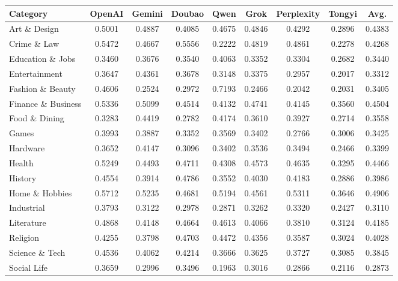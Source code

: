 \documentclass[11pt]{article}
\begin{document}
\begin{table}[H]
  \centering
  \small
  \begin{tabular}{lcccccccc}
  \toprule
  \textbf{Category} & \textbf{OpenAI} & \textbf{Gemini} & \textbf{Doubao} & \textbf{Qwen} & \textbf{Grok} & \textbf{Perplexity} & \textbf{Tongyi} & \textbf{Avg.} \\
  \midrule
  Art \& Design      & 0.5001 & 0.4887 & 0.4085 & 0.4675 & 0.4846 & 0.4292 & 0.2896 & 0.4383 \\
  Crime \& Law       & 0.5472 & 0.4667 & 0.5556 & 0.2222 & 0.4819 & 0.4861 & 0.2278 & 0.4268 \\
  Education \& Jobs  & 0.3460 & 0.3676 & 0.3540 & 0.4063 & 0.3352 & 0.3304 & 0.2682 & 0.3440 \\
  Entertainment      & 0.3647 & 0.4361 & 0.3678 & 0.3148 & 0.3375 & 0.2957 & 0.2017 & 0.3312 \\
  Fashion \& Beauty  & 0.4606 & 0.2524 & 0.2972 & 0.7193 & 0.2466 & 0.2042 & 0.2031 & 0.3405 \\
  Finance \& Business& 0.5336 & 0.5099 & 0.4514 & 0.4132 & 0.4741 & 0.4145 & 0.3560 & 0.4504 \\
  Food \& Dining     & 0.3283 & 0.4419 & 0.2782 & 0.4174 & 0.3610 & 0.3927 & 0.2714 & 0.3558 \\
  Games              & 0.3993 & 0.3887 & 0.3352 & 0.3569 & 0.3402 & 0.2766 & 0.3006 & 0.3425 \\
  Hardware           & 0.3652 & 0.4147 & 0.3096 & 0.3402 & 0.3536 & 0.3494 & 0.2466 & 0.3399 \\
  Health             & 0.5249 & 0.4493 & 0.4711 & 0.4308 & 0.4573 & 0.4635 & 0.3295 & 0.4466 \\
  History            & 0.4554 & 0.3914 & 0.4786 & 0.3552 & 0.4030 & 0.4183 & 0.2886 & 0.3986 \\
  Home \& Hobbies    & 0.5712 & 0.5235 & 0.4681 & 0.5194 & 0.4561 & 0.5311 & 0.3646 & 0.4906 \\
  Industrial         & 0.3793 & 0.3122 & 0.2978 & 0.2871 & 0.3262 & 0.3320 & 0.2427 & 0.3110 \\
  Literature         & 0.4868 & 0.4148 & 0.4664 & 0.4613 & 0.4066 & 0.3810 & 0.3124 & 0.4185 \\
  Religion           & 0.4255 & 0.3798 & 0.4703 & 0.4472 & 0.4356 & 0.3587 & 0.3024 & 0.4028 \\
  Science \& Tech    & 0.4536 & 0.4062 & 0.4214 & 0.3666 & 0.3625 & 0.3727 & 0.3085 & 0.3845 \\
  Social Life        & 0.3659 & 0.2996 & 0.3496 & 0.1963 & 0.3016 & 0.2866 & 0.2116 & 0.2873 \\

\end{tabular}
\end{table}
\end{document}
